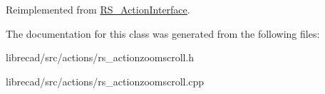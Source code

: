 Reimplemented from \hyperlink{classRS__ActionInterface_aa2ba8f6f697f735eace4ec5449c0b8cd}{R\-S\-\_\-\-Action\-Interface}.



The documentation for this class was generated from the following files\-:\begin{DoxyCompactItemize}
\item 
librecad/src/actions/rs\-\_\-actionzoomscroll.\-h\item 
librecad/src/actions/rs\-\_\-actionzoomscroll.\-cpp\end{DoxyCompactItemize}
